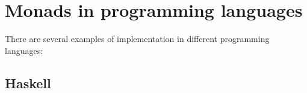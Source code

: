 
\section{Monads in programming languages}
There are several examples of  implementation in
different programming languages:

\subsection{Haskell}

